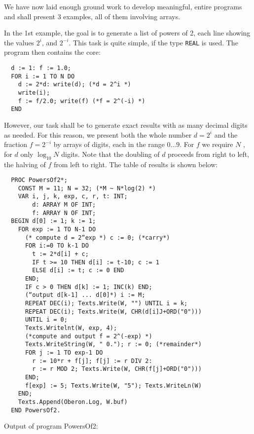 We have now laid enough ground work to develop meaningful, entire programs and shall
present 3 examples, all of them involving arrays.

In the 1st example, the goal is to generate a list of powers of 2, each line showing the
values $2^i$, and $2^{-i}$. This task is quite simple, if the type \verb|REAL| is used.
The program then contains the core:
\begin{verbatim}
  d := 1: f := 1.0;
  FOR i := 1 TO N DO
    d := 2*d: write(d); (*d = 2^i *)
    write(i);
    f := f/2.0; write(f) (*f = 2^(-i) *)
  END
\end{verbatim}
However, our task shall be to generate exact results with as many decimal digits as needed.
For this reason, we present both the whole number $d = 2^i$ and the fraction $f = 2^{-i}$
by arrays of digits, each in the range $0 \dots 9$. For $f$ we require $N$ , for $d$ only
$\log_{10}{N}$ digits. Note that the doubling of $d$ proceeds from right to left, the
halving of $f$ from left to right. The table of results is shown below:
\begin{verbatim}
  PROC PowersOf2*;
    CONST M = 11; N = 32; (*M ~ N*log(2) *)
    VAR i, j, k, exp, c, r, t: INT;
        d: ARRAY M OF INT;
        f: ARRAY N OF INT;
  BEGIN d[0] := 1; k := 1;
    FOR exp := 1 TO N-1 DO
      (* compute d = 2“exp *) c := 0; (*carry*)
      FOR i:=0 TO k-1 DO
        t := 2*d[i] + c;
        IF t >= 10 THEN d[i] := t-10; c := 1
        ELSE d[i] := t; c := 0 END
      END;
      IF c > 0 THEN d[k] := 1; INC(k) END;
      (“output d[k-1] ... d[0]*) i := M;
      REPEAT DEC(i); Texts.Write(W, "") UNTIL i = k;
      REPEAT DEC(i); Texts.Write(W, CHR(d[i]J+ORD("0")))
      UNTIL i = 0;
      Texts.Writelnt(W, exp, 4);
      (*compute and output f = 2^(-exp) *)
      Texts.WriteString(W, " 0."); r := 0; (*remainder*)
      FOR j := 1 TO exp-1 DO
        r := 10*r + f[j]; f[j] := r DIV 2:
        r := r MOD 2; Texts.Write(W, CHR(f[j]+ORD("0")))
      END;
      f[exp] := 5; Texts.Write(W, "5"); Texts.WriteLn(W)
    END;
    Texts.Append(Oberon.Log, W.buf)
  END PowersOf2.
\end{verbatim}
Output of program PowersOf2:
